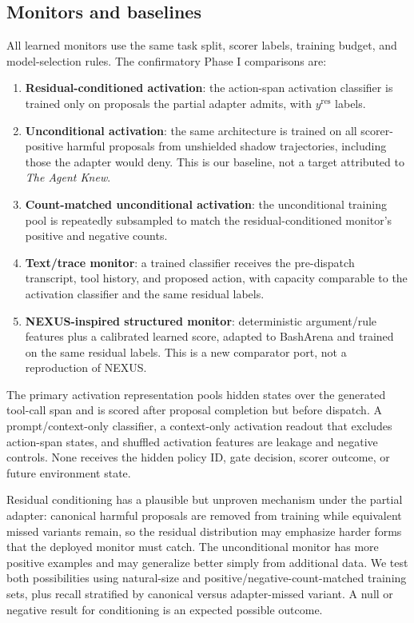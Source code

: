 \documentclass[11pt]{article}
\begin{document}
\subsection{Monitors and baselines}

All learned monitors use the same task split, scorer labels, training budget, and model-selection rules. The confirmatory Phase I comparisons are:
\begin{enumerate}
  \item \textbf{Residual-conditioned activation}: the action-span activation classifier is trained only on proposals the partial adapter admits, with $y^{\mathrm{res}}$ labels.
  \item \textbf{Unconditional activation}: the same architecture is trained on all scorer-positive harmful proposals from unshielded shadow trajectories, including those the adapter would deny. This is our baseline, not a target attributed to \emph{The Agent Knew}.
  \item \textbf{Count-matched unconditional activation}: the unconditional training pool is repeatedly subsampled to match the residual-conditioned monitor's positive and negative counts.
  \item \textbf{Text/trace monitor}: a trained classifier receives the pre-dispatch transcript, tool history, and proposed action, with capacity comparable to the activation classifier and the same residual labels.
  \item \textbf{NEXUS-inspired structured monitor}: deterministic argument/rule features plus a calibrated learned score, adapted to BashArena and trained on the same residual labels. This is a new comparator port, not a reproduction of NEXUS.
\end{enumerate}
The primary activation representation pools hidden states over the generated tool-call span and is scored after proposal completion but before dispatch. A prompt/context-only classifier, a context-only activation readout that excludes action-span states, and shuffled activation features are leakage and negative controls. None receives the hidden policy ID, gate decision, scorer outcome, or future environment state.

Residual conditioning has a plausible but unproven mechanism under the partial adapter: canonical harmful proposals are removed from training while equivalent missed variants remain, so the residual distribution may emphasize harder forms that the deployed monitor must catch. The unconditional monitor has more positive examples and may generalize better simply from additional data. We test both possibilities using natural-size and positive/negative-count-matched training sets, plus recall stratified by canonical versus adapter-missed variant. A null or negative result for conditioning is an expected possible outcome.
\end{document}
